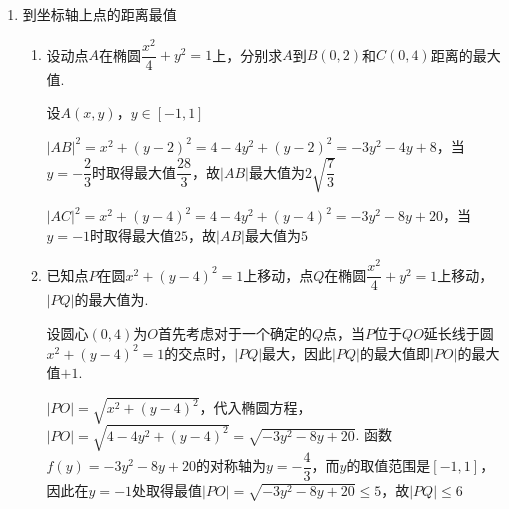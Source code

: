 \begin{enumerate}
\begin{enumerate}
\begin{jieda}
            则 $e = \dfrac{2c}{2a} = \dfrac{3\sqrt{2}k}{6k} = \dfrac{\sqrt{2}}{2}$ .
        \end{jieda}
        \item 已知椭圆 $E : \dfrac{{x}^{2}}{{a}^{2}} + \dfrac{{y}^{2}}{{b}^{2}} = 1\left( {a > b > 0}\right)$ 的左、右焦点分别为 ${F}_{1},{F}_{2}$ ,椭圆的上顶点为 $A$ ,射线 $A{F}_{1}$ 交椭圆 $E$ 于点 $B$ ,以 ${AB}$ 为直径的圆过 ${F}_{2}$ ,则椭圆 $E$ 的离心率是
        \begin{jieda}
            由题意 $\left| {A{F}_{1}}\right|  = \left| {A{F}_{2}}\right|  = a$ ,
            设 $\left| {B{F}_{1}}\right|  = t$ ,则 $\left| {B{F}_{2}}\right|  = {2a} - t$ ,            
            又以 ${AB}$ 为直径的圆过 ${F}_{2}$ ,            
            所以 $A{F}_{2} \bot  B{F}_{2}$ ,            
            所以 ${a}^{2} + {\left( 2a - t\right) }^{2} = {\left( a + t\right) }^{2}$ ,   
            解得 $t = \dfrac{2}{3}a$，根据定比分点可知$B\left(-\dfrac{5c}{3}, -\dfrac{2b}{3}\right)$

            根据椭圆第二定义可知$\dfrac{2}{3}a = a + e \cdot \left(-\dfrac{5c}{3}\right)$，故$e = \dfrac{\sqrt{5}}{5}$
        \end{jieda}
    \end{enumerate}
    \item 到坐标轴上点的距离最值
    \begin{enumerate}
        \item 设动点$A$在椭圆$\dfrac{x^2}{4}+y^2 = 1$上，分别求$A$到$B(0, 2)$和$C(0, 4)$距离的最大值.
        \begin{jieda}
            设$A(x, y)$，$y \in [-1, 1]$
            
            $|AB|^2 = x^2+(y-2)^2 = 4-4y^2+(y-2)^2 = -3y^2-4y+8$，当$y = -\dfrac{2}{3}$时取得最大值$\dfrac{28}{3}$，故$|AB|$最大值为$2\sqrt{\dfrac{7}{3}}$

            $|AC|^2 = x^2+(y-4)^2 = 4-4y^2+(y-4)^2 = -3y^2-8y+20$，当$y = -1$时取得最大值$25$，故$|AB|$最大值为$5$
        \end{jieda}
        \item 已知点$P$在圆$x^2+(y-4)^2 = 1$上移动，点$Q$在椭圆$\dfrac{x^2}{4}+y^2 = 1$上移动，$|PQ|$的最大值为.
        \begin{jieda}
            设圆心$(0, 4)$为$O$首先考虑对于一个确定的$Q$点，当$P$位于$QO$延长线于圆$x^2+(y-4)^2 = 1$的交点时，$|PQ|$最大，因此$|PQ|$的最大值即$|PO|$的最大值$+1.$

            $|PO| = \sqrt{x^2+(y-4)^2}$，代入椭圆方程，$|PO| = \sqrt{4-4y^2+(y-4)^2} = \sqrt{-3y^2-8y+20}$. 函数$f(y) = -3y^2-8y+20$的对称轴为$y = -\dfrac{4}{3}$，而$y$的取值范围是$[-1, 1]$，因此在$y = -1$处取得最值$|PO| = \sqrt{-3y^2-8y+20} \leq 5$，故$|PQ| \leq 6$
        \end{jieda}


\end{enumerate}
\end{enumerate}
